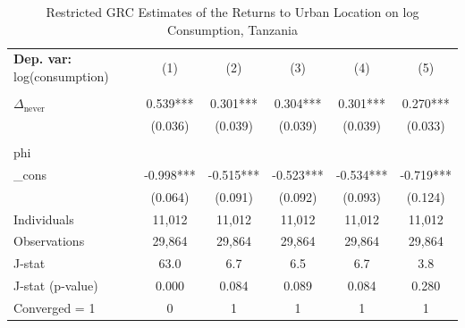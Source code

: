 \begin{table}[htbp] \centering \begin{threeparttable}
 \caption{Restricted GRC Estimates of the Returns to Urban Location on log Consumption, Tanzania} 
 \label{tab:GRC_TZA_consumption_urban_unb} 
\begin{tabular}{l ccccc} \toprule  \textbf{Dep. var:}  log(consumption) 
                    &\multicolumn{1}{c}{(1)}   &\multicolumn{1}{c}{(2)}   &\multicolumn{1}{c}{(3)}   &\multicolumn{1}{c}{(4)}   &\multicolumn{1}{c}{(5)}   \\
                    &               &               &               &               &               \\
\addlinespace
$\Delta_{\text{never}}$&       0.539***&       0.301***&       0.304***&       0.301***&       0.270***\\
                    &     (0.036)   &     (0.039)   &     (0.039)   &     (0.039)   &     (0.033)   \\
                    &               &               &               &               &               \\
\addlinespace
phi                 &               &               &               &               &               \\
_cons               &      -0.998***&      -0.515***&      -0.523***&      -0.534***&      -0.719***\\
                    &     (0.064)   &     (0.091)   &     (0.092)   &     (0.093)   &     (0.124)   \\
\addlinespace
Individuals         &      11,012   &      11,012   &      11,012   &      11,012   &      11,012   \\
Observations        &      29,864   &      29,864   &      29,864   &      29,864   &      29,864   \\
J-stat              &        63.0   &         6.7   &         6.5   &         6.7   &         3.8   \\
J-stat (p-value)    &       0.000   &       0.084   &       0.089   &       0.084   &       0.280   \\
Converged = 1       &           0   &           1   &           1   &           1   &           1   \\

\end{tabular}
\end{threeparttable}
\end{table}
